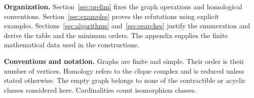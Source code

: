 \medskip\noindent\textbf{Organization.}
Section~\ref{sec:prelim} fixes the graph operations and homological
conventions. Section~\ref{sec:examples} proves the refutations using
explicit examples. Sections~\ref{sec:algorithms} and~\ref{sec:searches}
justify the enumeration and derive the table and the minimum orders.
The appendix supplies the finite mathematical data used in the
constructions.

\medskip\noindent\textbf{Conventions and notation.}
Graphs are finite and simple. Their order is their number of vertices.
Homology refers to the clique complex and is reduced unless stated
otherwise. The empty graph belongs to none of the contractible or
acyclic classes considered here. Cardinalities count isomorphism classes.
